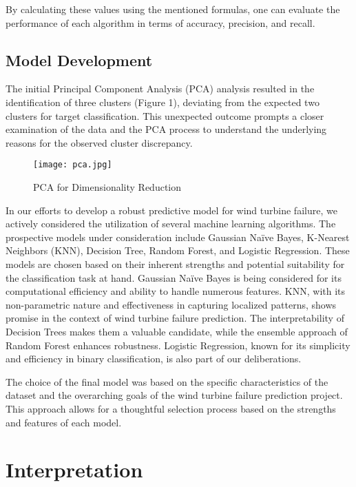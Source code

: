\documentclass[11pt,a4paper]{article}
\begin{document}
By calculating these values using the mentioned formulas, one can evaluate the performance of each algorithm in terms of accuracy, precision, and recall.

\subsection{Model Development}
The initial Principal Component Analysis (PCA) analysis resulted in the identification of three clusters (Figure 1), deviating from the expected two clusters for target classification. This unexpected outcome prompts a closer examination of the data and the PCA process to understand the underlying reasons for the observed cluster discrepancy.


\begin{figure}[h]
    \centering
    \texttt{[image: pca.jpg]}
    \caption{PCA for Dimensionality Reduction}
    \label{fig:enter-label}
\end{figure}

In our efforts to develop a robust predictive model for wind turbine failure, we  actively considered the utilization of several machine learning algorithms. The prospective models under consideration include Gaussian Naïve Bayes, K-Nearest Neighbors (KNN), Decision Tree, Random Forest, and Logistic Regression. These models are chosen based on their inherent strengths and potential suitability for the classification task at hand. Gaussian Naïve Bayes is being considered for its computational efficiency and ability to handle numerous features. KNN, with its non-parametric nature and effectiveness in capturing localized patterns, shows promise in the context of wind turbine failure prediction. The interpretability of Decision Trees makes them a valuable candidate, while the ensemble approach of Random Forest enhances robustness. Logistic Regression, known for its simplicity and efficiency in binary classification, is also part of our deliberations. 

The choice of the final model was based on the specific characteristics of the dataset and the overarching goals of the wind turbine failure prediction project. This approach allows for a thoughtful selection process based on the strengths and features of each model.


\section{Interpretation}
\end{document}

